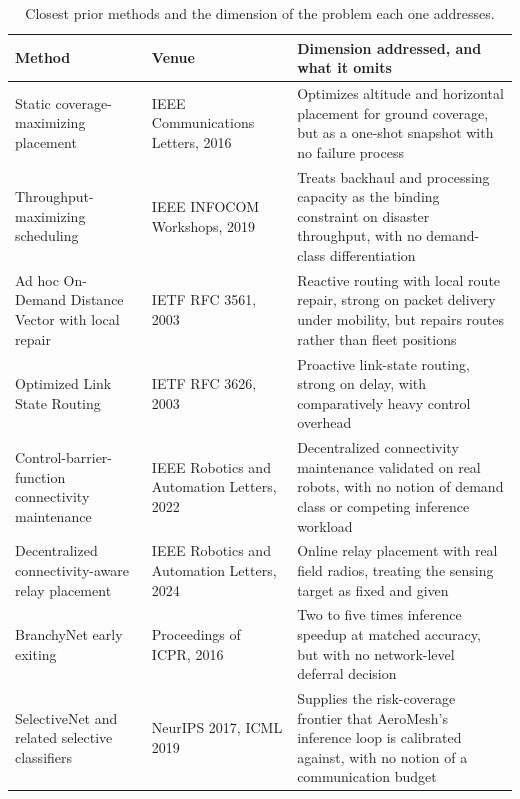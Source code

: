 \documentclass[drones,article,submit,moreauthors]{Definitions/mdpi}
\begin{document}
\begin{table}[H]
\caption{Closest prior methods and the dimension of the problem each one addresses.}
\label{tab:baselines}
\begin{tabular}{p{3.6cm}p{3.0cm}p{6.1cm}}
\toprule
\textbf{Method} & \textbf{Venue} & \textbf{Dimension addressed, and what it omits} \\
\midrule
Static coverage-maximizing placement \cite{mozaffari2016efficient} & IEEE Communications Letters, 2016 & Optimizes altitude and horizontal placement for ground coverage, but as a one-shot snapshot with no failure process \\
Throughput-maximizing scheduling \cite{chiaraviglio2019optimal} & IEEE INFOCOM Workshops, 2019 & Treats backhaul and processing capacity as the binding constraint on disaster throughput, with no demand-class differentiation \\
Ad hoc On-Demand Distance Vector with local repair \cite{perkins2003aodv,biomo2014enhanced} & IETF RFC 3561, 2003 & Reactive routing with local route repair, strong on packet delivery under mobility, but repairs routes rather than fleet positions \\
Optimized Link State Routing \cite{clausen2003olsr} & IETF RFC 3626, 2003 & Proactive link-state routing, strong on delay, with comparatively heavy control overhead \\
Control-barrier-function connectivity maintenance \cite{capelli2022network} & IEEE Robotics and Automation Letters, 2022 & Decentralized connectivity maintenance validated on real robots, with no notion of demand class or competing inference workload \\
Decentralized connectivity-aware relay placement \cite{tardioli2024decentralized} & IEEE Robotics and Automation Letters, 2024 & Online relay placement with real field radios, treating the sensing target as fixed and given \\
BranchyNet early exiting \cite{teerapittayanon2016branchynet} & Proceedings of ICPR, 2016 & Two to five times inference speedup at matched accuracy, but with no network-level deferral decision \\
SelectiveNet and related selective classifiers \cite{geifman2017selective,geifman2019selectivenet} & NeurIPS 2017, ICML 2019 & Supplies the risk-coverage frontier that AeroMesh's inference loop is calibrated against, with no notion of a communication budget \\
\bottomrule
\end{tabular}
\end{table}
\end{document}
